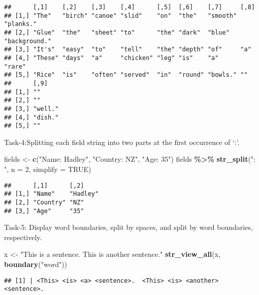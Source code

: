 \documentclass[
]{article}
\newenvironment{Shaded}{\begin{snugshade}}{\end{snugshade}}
\newcommand{\AttributeTok}[1]{\textcolor[rgb]{0.13,0.29,0.53}{#1}}
\newcommand{\ConstantTok}[1]{\textcolor[rgb]{0.56,0.35,0.01}{#1}}
\newcommand{\DecValTok}[1]{\textcolor[rgb]{0.00,0.00,0.81}{#1}}
\newcommand{\FunctionTok}[1]{\textcolor[rgb]{0.13,0.29,0.53}{\textbf{#1}}}
\newcommand{\NormalTok}[1]{#1}
\newcommand{\OtherTok}[1]{\textcolor[rgb]{0.56,0.35,0.01}{#1}}
\newcommand{\SpecialCharTok}[1]{\textcolor[rgb]{0.81,0.36,0.00}{\textbf{#1}}}
\newcommand{\StringTok}[1]{\textcolor[rgb]{0.31,0.60,0.02}{#1}}
\begin{document}
\begin{verbatim}
##      [,1]    [,2]    [,3]    [,4]      [,5]  [,6]    [,7]     [,8]         
## [1,] "The"   "birch" "canoe" "slid"    "on"  "the"   "smooth" "planks."    
## [2,] "Glue"  "the"   "sheet" "to"      "the" "dark"  "blue"   "background."
## [3,] "It's"  "easy"  "to"    "tell"    "the" "depth" "of"     "a"          
## [4,] "These" "days"  "a"     "chicken" "leg" "is"    "a"      "rare"       
## [5,] "Rice"  "is"    "often" "served"  "in"  "round" "bowls." ""           
##      [,9]   
## [1,] ""     
## [2,] ""     
## [3,] "well."
## [4,] "dish."
## [5,] ""
\end{verbatim}

Task-4:Splitting each field string into two parts at the first
occurrence of `:'.

\begin{Shaded}
\begin{Highlighting}[]
\NormalTok{fields }\OtherTok{\textless{}{-}} \FunctionTok{c}\NormalTok{(}\StringTok{"Name: Hadley"}\NormalTok{, }\StringTok{"Country: NZ"}\NormalTok{, }\StringTok{"Age: 35"}\NormalTok{)}
\NormalTok{fields }\SpecialCharTok{\%\textgreater{}\%} \FunctionTok{str\_split}\NormalTok{(}\StringTok{": "}\NormalTok{, }\AttributeTok{n =} \DecValTok{2}\NormalTok{, }\AttributeTok{simplify =} \ConstantTok{TRUE}\NormalTok{)}
\end{Highlighting}
\end{Shaded}

\begin{verbatim}
##      [,1]      [,2]    
## [1,] "Name"    "Hadley"
## [2,] "Country" "NZ"    
## [3,] "Age"     "35"
\end{verbatim}

Task-5: Display word boundaries, split by spaces, and split by word
boundaries, respectively.

\begin{Shaded}
\begin{Highlighting}[]
\NormalTok{x }\OtherTok{\textless{}{-}} \StringTok{"This is a sentence.  This is another sentence."}
\FunctionTok{str\_view\_all}\NormalTok{(x, }\FunctionTok{boundary}\NormalTok{(}\StringTok{"word"}\NormalTok{))}
\end{Highlighting}
\end{Shaded}

\begin{verbatim}
## [1] | <This> <is> <a> <sentence>.  <This> <is> <another> <sentence>.
\end{verbatim}
\end{document}
